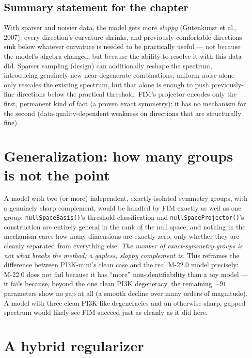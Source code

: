 \documentclass[11pt]{article}
\newcommand{\code}[1]{\texttt{#1}}
\begin{document}
\subsection{Summary statement for the chapter}

With sparser and noisier data, the model gets more \emph{sloppy}
(Gutenkunst et al., 2007): every direction's curvature shrinks, and
previously-comfortable directions sink below whatever curvature is needed to
be practically useful --- not because the model's algebra changed, but
because the ability to resolve it with this data did. Sparser sampling
(design) can additionally reshape the spectrum, introducing genuinely new
near-degenerate combinations; uniform noise alone only rescales the existing
spectrum, but that alone is enough to push previously-fine directions below
the practical threshold. FIM's projector encodes only the first, permanent
kind of fact (a proven exact symmetry); it has no mechanism for the second
(data-quality-dependent weakness on directions that are structurally fine).

\section{Generalization: how many groups is not the point}
\label{sec:generalization}

A model with two (or more) independent, exactly-isolated symmetry groups,
with a genuinely sharp complement, would be handled by FIM exactly as
well as one group: \code{nullSpaceBasis()}'s threshold classification and
\code{nullSpaceProjector()}'s construction are entirely general in the rank
of the null space, and nothing in the mechanism cares how many dimensions
are exactly zero, only whether they are cleanly separated from everything
else. \emph{The number of exact-symmetry groups is not what breaks the
method; a gapless, sloppy complement is.} This reframes the difference
between PI3K-mini's clean case and the real M-22.0 model precisely: M-22.0
does not fail because it has ``more'' non-identifiability than a toy model
--- it fails because, beyond the one clean PI3K degeneracy, the remaining
$\sim\!91$ parameters show no gap at all (a smooth decline over many orders
of magnitude). A model with three clean PI3K-like degeneracies and an
otherwise sharp, gapped spectrum would likely see FIM succeed just as
cleanly as it did here.

\section{A hybrid regularizer}
\label{sec:hybrid}
\end{document}
